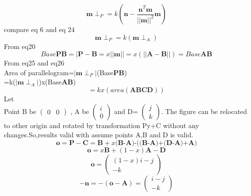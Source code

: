 \documentclass[journal,10pt,twocolumn]{article}
\begin{document}
\begin{equation}
\boldsymbol{m} \perp_P=k(\boldsymbol{n}-{\frac{\boldsymbol{n}^T\boldsymbol{m}}{||\boldsymbol{m}||^2}}\boldsymbol{m})
\end{equation}
compare eq 6 and eq 24
\begin{equation}
\boldsymbol{m} \perp_P=k(\boldsymbol{m} \perp_A)
\end{equation}
From eq20
\begin{equation}
	Base\textbf{PB}=|\boldsymbol{P}-\boldsymbol{B}=x||\boldsymbol{m}||=x(||\boldsymbol{A}-\boldsymbol{B}||)=Base\textbf{AB}
\end{equation}
From eq25 and eq26\\
Area of parallelogram=$|\boldsymbol{m}\perp_P|$(Base\textbf{PB})\\
=k($|\boldsymbol{m}\perp_A|$)x(Base\textbf{AB})
\begin{equation}
	=kx(area(\textbf{ABCD}))
\end{equation}
Let\\
Point B be
$\begin{pmatrix}
    0&0
\end{pmatrix}$
, A be 
$\begin{pmatrix}
    i \\
    0
\end{pmatrix}$
and D=
$\begin{pmatrix}
    j\\
    k
\end{pmatrix}$.
The figure can be relocated to other origin and rotated by transformation Py+C without any changes.So,results valid with assume points A,B and D is valid.
\begin{equation}
	\boldsymbol{o}=\boldsymbol{P}-\boldsymbol{C}=\boldsymbol{B}+x\textbf{(B-A)-((B-A)+(D-A)+A)}
\end{equation}
\begin{equation}
    \boldsymbol{o}=x\boldsymbol{B}+(1-x)\boldsymbol{A}-\boldsymbol{D}
\end{equation}
\begin{equation}
    \boldsymbol{o}=
    \begin{pmatrix}
        (1-x)i-j\\
        -k
    \end{pmatrix}
\end{equation}
\begin{equation}
    -\boldsymbol{n}=-(\boldsymbol{o}-\boldsymbol{A})=
    \begin{pmatrix}
        i-j\\
        -k
    \end{pmatrix}
\end{equation}
\end{document}
